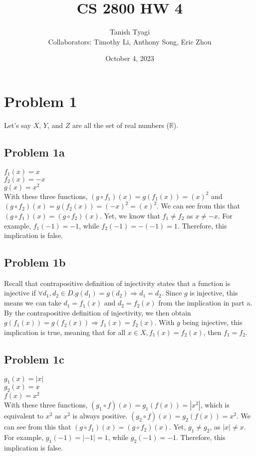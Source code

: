 \documentclass{article}
\title{\textbf{CS 2800 HW 4}}
\author{Tanish Tyagi \\ Collaborators: Timothy Li, Anthony Song, Eric Zhou}
\date{October 4, 2023}
\begin{document}
\maketitle

\section{Problem 1}

Let's say $X$, $Y$, and $Z$ are all the set of real numbers ($\mathbb{R}$).

\subsection{Problem 1a}

$f_1(x) = x$ \\
$f_2(x) = -x$ \\
$g(x) = x^2$ \\

With these three functions, $(g \circ f_1)(x) = g(f_1(x)) = (x)^2$ and $(g \circ f_2)(x) = g(f_2(x)) = (-x)^2 = (x)^2$. We can see from this that $(g \circ f_1)(x) = (g \circ f_2)(x)$. Yet, we know that $f_1 \neq f_2$ as $x \neq -x$. For example, $f_1(-1) = -1$, while $f_2(-1) = -(-1) = 1$. Therefore, this implication is false.

\subsection{Problem 1b}

Recall that contrapositive definition of injectivity states that a function is injective if $\forall d_1, d_2 \in D. g(d_1) = g(d_2) \Rightarrow d_1 = d_2$. Since $g$ is injective, this means we can take $d_1 = f_1(x)$ and $d_2 = f_2(x)$ from the implication in part a. By the contrapositive definition of injectivity, we then obtain $g(f_1(x)) = g(f_2(x)) \Rightarrow f_1(x) = f_2(x)$. With $g$ being injective, this implication is true, meaning that for all $x \in X, f_1(x) = f_2(x)$, then $f_1 = f_2$.

\subsection{Problem 1c} 

$g_1(x) = |x|$ \\
$g_2(x) = x$ \\
$f(x) = x^2$ \\

With these three functions, $(g_1 \circ f)(x) = g_1(f(x)) = |x^2|$, which is equivalent to $x^2$ as $x^2$ is always positive. $(g_2 \circ f)(x) = g_2(f(x)) = x^2$. We can see from this that  $(g \circ f_1)(x) = (g \circ f_2)(x)$. Yet, $g_1 \neq g_2$, as $|x| \neq x$. For example, $g_1(-1) = |-1| = 1$, while $g_2(-1) = -1$. Therefore, this implication is false.
\end{document}
